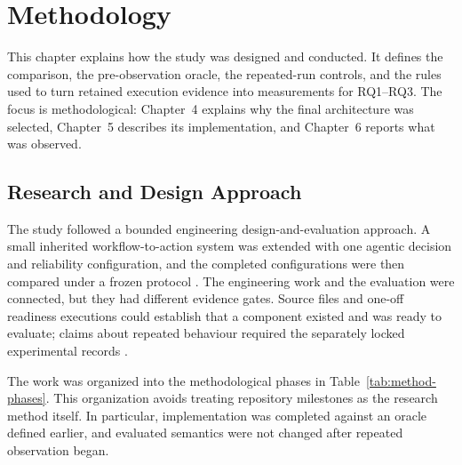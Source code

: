\section{Methodology}\label{sec:method}

\setlength{\emergencystretch}{4em}

This chapter explains how the study was designed and conducted. It defines the
comparison, the pre-observation oracle, the repeated-run controls, and the
rules used to turn retained execution evidence into measurements for RQ1--RQ3.
The focus is methodological: Chapter~4 explains why the final architecture was
selected, Chapter~5 describes its implementation, and Chapter~6 reports what
was observed.

\subsection{Research and Design Approach}\label{subsec:method-approach}

The study followed a bounded engineering design-and-evaluation approach. A
small inherited workflow-to-action system was extended with one agentic
decision and reliability configuration, and the completed configurations were
then compared under a frozen protocol \cite{wohlin2012experimentation}. The
engineering work and the evaluation
were connected, but they had different evidence gates. Source files and
one-off readiness executions could establish that a component existed and was
ready to evaluate; claims about repeated behaviour required the separately
locked experimental records \cite{kapoor2025agentsmatter}.

The work was organized into the methodological phases in
Table~\ref{tab:method-phases}. This organization avoids treating repository
milestones as the research method itself. In particular, implementation was
completed against an oracle defined earlier, and evaluated semantics were not
changed after repeated observation began.

